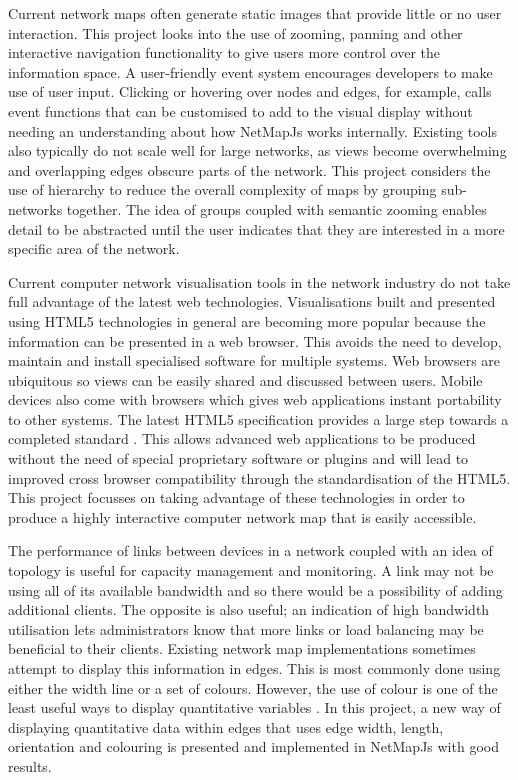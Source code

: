 \documentclass[11pt, a4paper]{article}
\begin{document}
 
Current network maps often generate static images that provide little or no user
interaction. This project looks into the use of zooming, panning and other
interactive navigation functionality to give users more control over the
information space. A user-friendly event system encourages developers to make
use of user input. Clicking or hovering over nodes and edges, for example, calls
event functions that can be customised to add to the visual display without
needing an understanding about how NetMapJs works internally. Existing tools
also typically do not scale well for large networks, as views become
overwhelming and overlapping edges obscure parts of the network. This project
considers the use of hierarchy to reduce the overall complexity of maps by
grouping sub-networks together. The idea of groups coupled with semantic zooming
enables detail to be abstracted until the user indicates that they are
interested in a more specific area of the network.

Current computer network visualisation tools in the network industry do not take
full advantage of the latest web technologies. Visualisations built and
presented using HTML5 technologies in general are becoming more popular because
the information can be presented in a web browser. This avoids the need to
develop, maintain and install specialised software for multiple systems. Web
browsers are ubiquitous so views can be easily shared and discussed between
users. Mobile devices also come with browsers which gives web applications
instant portability to other systems. The latest HTML5 specification provides a
large step towards a completed standard \cite{HTML5_website}. This allows
advanced web applications to be produced without the need of special proprietary 
software or plugins and will lead to improved cross browser compatibility
through the standardisation of the HTML5. This project focusses on taking
advantage of these technologies in order to produce a highly interactive
computer network map that is easily accessible.

The performance of links between devices in a network coupled with an idea of
topology is useful for capacity management and monitoring. A link may not be
using all of its available bandwidth and so there would be a possibility of
adding additional clients. The opposite is also useful; an indication of high
bandwidth utilisation lets administrators know that more links or load balancing
may be beneficial to their clients. Existing network map implementations
sometimes attempt to display this information in edges. This is most commonly
done using either the width line or a set of colours. However, the use of colour
is one of the least useful ways to display quantitative variables
\cite{Spence_2007}.  In this project, a new way of displaying quantitative data
within edges that uses edge width, length, orientation and colouring is
presented and implemented in NetMapJs with good results.
\end{document}
